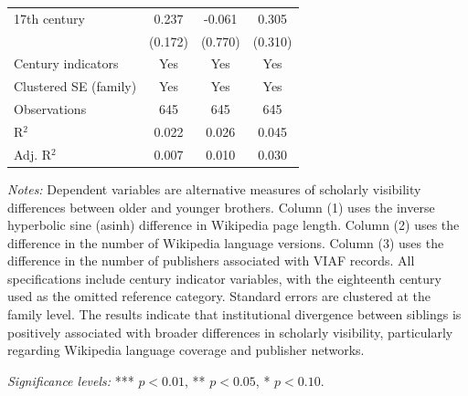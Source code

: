 \begin{table}[H]
\begin{tablebody}
\begin{tabular}{p{5cm} c c c}
17th century
& 0.237 
& -0.061 
& 0.305 \\
& (0.172) 
& (0.770) 
& (0.310) \\

\midrule
Century indicators & Yes & Yes & Yes \\
Clustered SE (family) & Yes & Yes & Yes \\
\midrule

Observations & 645 & 645 & 645 \\
R$^{2}$ & 0.022 & 0.026 & 0.045 \\
Adj. R$^{2}$ & 0.007 & 0.010 & 0.030 \\
\bottomrule
\end{tabular}
\end{tablebody}

\vspace{4pt}
\begin{minipage}{\textwidth}
\footnotesize
\textit{Notes:} Dependent variables are alternative measures of scholarly visibility differences between older and younger brothers. Column (1) uses the inverse hyperbolic sine (asinh) difference in Wikipedia page length. Column (2) uses the difference in the number of Wikipedia language versions. Column (3) uses the difference in the number of publishers associated with VIAF records. All specifications include century indicator variables, with the eighteenth century used as the omitted reference category. Standard errors are clustered at the family level. The results indicate that institutional divergence between siblings is positively associated with broader differences in scholarly visibility, particularly regarding Wikipedia language coverage and publisher networks.

\textit{Significance levels:} *** $p<0.01$, ** $p<0.05$, * $p<0.10$.
\end{minipage}

\end{table}